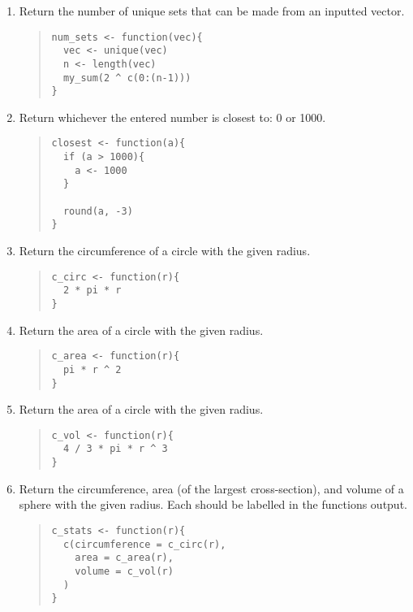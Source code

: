 \documentclass{article}
\begin{document}
\begin{enumerate}
\item Return the number of unique sets that can be made from an inputted vector.
  \begin{quote}
    \begin{verbatim}
num_sets <- function(vec){
  vec <- unique(vec)
  n <- length(vec)
  my_sum(2 ^ c(0:(n-1)))
}
    \end{verbatim}
  \end{quote}

\item Return whichever the entered number is closest to: 0 or 1000.
  \begin{quote}
    \begin{verbatim}
closest <- function(a){
  if (a > 1000){
  	a <- 1000
  }
  
  round(a, -3)
}
    \end{verbatim}
  \end{quote}

\item Return the circumference of a circle with the given radius.
  \begin{quote}
    \begin{verbatim}
c_circ <- function(r){
  2 * pi * r
}    
    \end{verbatim}
  \end{quote}

\item Return the area of a circle with the given radius.
  \begin{quote}
    \begin{verbatim}
c_area <- function(r){
  pi * r ^ 2
}
    \end{verbatim}
  \end{quote}
  
  \item Return the area of a circle with the given radius.
  \begin{quote}
    \begin{verbatim}
c_vol <- function(r){
  4 / 3 * pi * r ^ 3
}	    
    \end{verbatim}
  \end{quote}
  
\item Return the circumference, area (of the largest cross-section), and volume of a sphere with the given radius. Each should be labelled in the functions output.
  \begin{quote}
    \begin{verbatim}
c_stats <- function(r){
  c(circumference = c_circ(r),
    area = c_area(r),
    volume = c_vol(r)
  )
}    
    \end{verbatim}
  \end{quote}


\end{enumerate}
\end{document}
